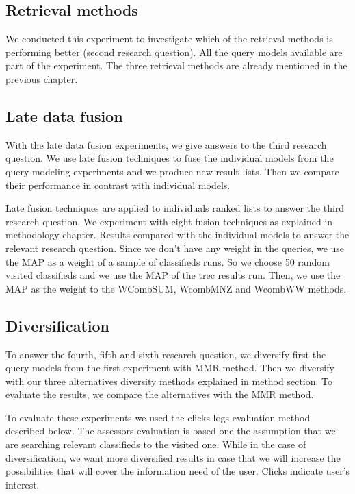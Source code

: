 \subsection{Retrieval methods}
We conducted this experiment to investigate which of the retrieval methods is performing better (second research question). All the query models available are part of the experiment. The three retrieval methods are already mentioned in the previous chapter.


\subsection{Late data fusion}

With the late data fusion experiments, we give answers to the third research question. We use late fusion techniques to fuse the individual models from the query modeling experiments and we produce new result lists. Then we compare their performance in contrast with individual models.


Late fusion techniques are applied to individuals ranked lists to answer the third research question. We experiment with eight fusion techniques as explained in methodology chapter. Results compared with the individual models to answer the relevant research question. Since we don't have any weight in the queries, we use the MAP as a weight of a sample of classifieds runs. So we choose 50 random visited classifieds and we use the MAP of the trec results run. Then, we use the MAP as the weight to the WCombSUM, WcombMNZ and WcombWW methods.

\subsection{Diversification}
To answer the fourth, fifth and sixth research question, we diversify first the query models from the first experiment with MMR method. Then we diversify with our three alternatives diversity methods explained in method section. To evaluate the results, we compare the alternatives with the MMR method.

To evaluate these experiments we used the clicks logs evaluation method described below. The assessors evaluation is based one the assumption that we are searching relevant classifieds to the visited one. While in the case of diversification, we want more diversified results in case that we will increase the possibilities that will cover the information need of the user. Clicks indicate user's interest.


